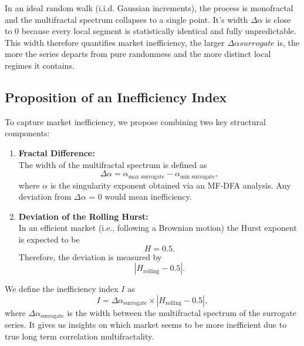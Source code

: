\documentclass[11pt]{extarticle}
\begin{document}
In an ideal random walk (i.i.d. Gaussian increments), the process is monofractal and the multifractal spectrum collapses to a single point.
It's width $\Delta \alpha$ is close to 0 because every local segment is statistically identical and fully unpredictable.
This width therefore quantifies market inefficiency, the larger $\Delta \alpha surrogate $ is, the more the series departs from pure randomness
and the more distinct local regimes it contains.



\subsection{Proposition of an Inefficiency Index}

To capture market inefficiency, we propose combining two key structural components:

\begin{enumerate}
    \item \textbf{Fractal Difference:}\\[1ex]
    The width of the multifractal spectrum is defined as
    \begin{equation}
    \Delta \alpha = \alpha_{\text{max surrogate}} - \alpha_{\text{min surrogate}},
    \end{equation}
    where $\alpha$ is the singularity exponent obtained via an MF-DFA analysis. Any deviation from $\Delta \alpha$ = 0 would mean inefficiency.

    \item \textbf{Deviation of the Rolling Hurst:}\\[1ex]
    In an efficient market (i.e., following a Brownian motion) the Hurst exponent is expected to be
    \begin{equation}
    H = 0.5.
    \end{equation}
    Therefore, the deviation is measured by
    \begin{equation}
    \left|H_{\text{rolling}} - 0.5\right|.
    \end{equation}
\end{enumerate}

We define the inefficiency index $I$ as
\begin{equation}
I = \Delta\alpha_{\text{surrogate}} \times \left|H_{\text{rolling}} - 0.5\right|,
\end{equation}
where $\Delta\alpha_{\text{surrogate}}$ is the width between the multifractal spectrum of the surrogate series.
It gives us insights on which market seems to be more inefficient due to true long term correlation multifractality.
\end{document}
